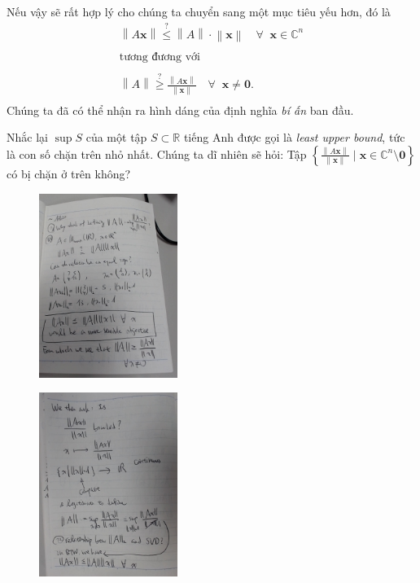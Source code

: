 \documentclass{article}
\newcommand{\norm}[1]{\left\lVert#1\right\rVert}
\begin{document}
Nếu vậy sẽ rất hợp lý cho chúng ta chuyển sang một mục tiêu yếu hơn, đó là
$$
  \begin{aligned}
    \norm{A\mathbf{x}} \stackrel{?}{\le} \norm{A}\cdot\norm{\mathbf{x}} \quad\forall\;\; \mathbf{x} \in \mathbb{C}^n \\
		\\
		\text{tương đương với} \\
		\\
		\norm{A} \stackrel{?}{\ge}  \frac{\norm{A\mathbf{x}}}{\norm{\mathbf{x}}}  \quad\forall\;\; \mathbf{x} \ne \mathbf{0}. \\
  \end{aligned}
$$
Chúng ta đã có thể nhận ra hình dáng của định nghĩa \textit{bí ấn} ban đầu.

Nhắc lại $\sup S$ của một tập $S \subset \mathbb{R}$ tiếng Anh được gọi là \textit{least upper bound}, tức là con số chặn trên nhỏ nhất.
Chúng ta dĩ nhiên sẽ hỏi:
Tập $\left\{\frac{\norm{A\mathbf{x}}}{\norm{\mathbf{x}}} \;|\; \mathbf{x} \in \mathbb{C}^n \setminus \mathbf{0}\right\}$ có bị chặn ở trên không?


\begin{figure}
\includegraphics[width=0.4\textwidth]{01-motivation.jpg}
\end{figure}

\begin{figure}
\includegraphics[width=0.4\textwidth]{02-moti_cont.jpg}
\end{figure}
\blindtext


\blindtext

\end{document}
